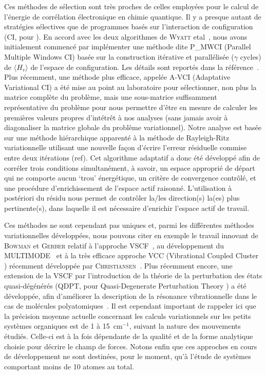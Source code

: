 Ces méthodes de sélection sont très proches de celles employées pour le calcul de l'énergie de corrélation électronique en chimie quantique. Il y a presque autant de stratégies sélectives que de programmes basés sur l'interaction de configuration (CI, pour \og {}). En accord avec les deux algorithmes de \textsc{Wyatt} etal~\cite{algowyatt}, nous avons initialement commencé par implémenter une méthode dite P\_MWCI (Parallel Multiple Windows CI) basée sur la construction itérative et parallélisée ($\gamma$ cycles) de $\langle H_{v} \rangle$ de l’espace de configuration. Les détails sont reportés dans la référence~\cite{begue}. Plus récemment, une méthode plus efficace, appelée A-VCI (Adaptative Variational CI) a été mise au point au laboratoire pour sélectionner, non plus la matrice complète du problème, mais une sous-matrice suffisamment représentative du problème pour nous permettre d’être en mesure de calculer les premières valeurs propres d’intétrêt à nos analyses (sans jamais avoir à diagonaliser la matrice globale du problème variationnel). Notre analyse est basée sur une méthode hiérarchique apparenté à la méthode de Rayleigh-Ritz variationnelle utilisant une nouvelle façon d’écrire l’erreur résiduelle commise entre deux itérations (ref). Cet algorithme adaptatif a donc été développé afin de corréler trois conditions simultanément, à savoir, un espace approprié de départ qui ne comporte aucun ‘trou’ énergétique, un critère de convergence contrôlé, et une procédure d’enrichissement de l'espace actif raisonné. L’utilisation à postériori du résidu nous permet de contrôler la/les direction(s) la(es) plus pertinente(s), dans laquelle il est nécessaire d’enrichir l’espace actif de travail.

Ces méthodes ne sont cependant pas uniques et, parmi les différentes méthodes variationnelles développées, nous pouvons citer en exemple le travail innovant de \textsc{Bowman} et \textsc{Gerber} relatif à l'approche VSCF~\cite{vscfa,vscfb,vscfc,vscfd}, au développement du MULTIMODE~\cite{multimode} et à la très efficace approche VCC (\og Vibrational Coupled Cluster \fg{}) récemment développée par \textsc{Christiansen}~\cite{christ}. Plus récemment encore, une extension de la VSCF par l'introduction de la théorie de la perturbation des états quasi-dégénérés (QDPT, pour \og Quasi-Degenerate Perturbation Theory \fg{}) a été développée, afin d'améliorer la description de la résonance vibrationnelle dans le cas de molécules polyatomiques~\cite{polyatomic}. Il est cependant important de rappeler ici que la précision moyenne actuelle concernant les calculs variationnels sur les petits systèmes organiques est de 1 à 15~cm$^{-1}$, suivant la nature des mouvements étudiés. Celle-ci est à la fois dépendante de la qualité et de la forme analytique choisie pour décrire le champ de forces. Notons enfin que ces approches en cours de développement ne sont destinées, pour le moment, qu’à l’étude de systèmes comportant moins de 10 atomes au total.


